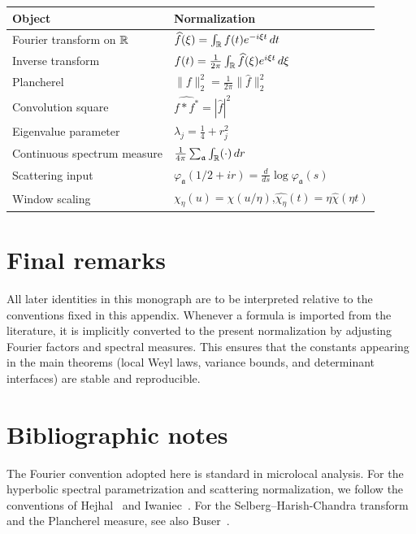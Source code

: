 \begin{center}
\begin{tabular}{ll}
\hline
\textbf{Object} & \textbf{Normalization} \\
\hline
Fourier transform on $\mathbb{R}$ & $\widehat{f}(\xi)=\int_{\mathbb{R}} f(t)e^{-i\xi t}\,dt$ \\
Inverse transform & $f(t)=\frac{1}{2\pi}\int_{\mathbb{R}}\widehat{f}(\xi)e^{i\xi t}\,d\xi$ \\
Plancherel & $\|f\|_2^2=\frac{1}{2\pi}\|\widehat{f}\|_2^2$ \\
Convolution square & $\widehat{f*f^\ast}=|\widehat{f}|^2$ \\
Eigenvalue parameter & $\lambda_j=\frac14+r_j^2$ \\
Continuous spectrum measure & $\frac{1}{4\pi}\sum_{\mathfrak{a}}\int_{\mathbb{R}}(\cdot)\,dr$ \\
Scattering input & $\varphi_{\mathfrak{a}}(1/2+ir)=\frac{d}{ds}\log\varphi_{\mathfrak{a}}(s)$ \\
Window scaling & $\chi_\eta(u)=\chi(u/\eta)$,\quad $\widehat{\chi_\eta}(t)=\eta\widehat{\chi}(\eta t)$ \\
\hline
\end{tabular}
\end{center}

\section{Final remarks}
\label{sec:G.final}

All later identities in this monograph are to be interpreted relative to the conventions fixed in this appendix.
Whenever a formula is imported from the literature, it is implicitly converted to the present normalization by
adjusting Fourier factors and spectral measures.
This ensures that the constants appearing in the main theorems (local Weyl laws, variance bounds, and determinant
interfaces) are stable and reproducible.

\section*{Bibliographic notes}

The Fourier convention adopted here is standard in microlocal analysis.
For the hyperbolic spectral parametrization and scattering normalization, we follow the conventions of
Hejhal~\cite{Hejhal1983} and Iwaniec~\cite{Iwaniec2002}.
For the Selberg--Harish-Chandra transform and the Plancherel measure, see also Buser~\cite{Buser1992}.


